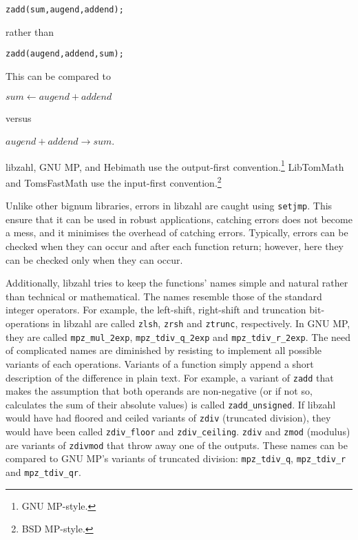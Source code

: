 \begin{alltt}
   zadd(sum, augend, addend);
\end{alltt}

\noindent
rather than

\begin{alltt}
   zadd(augend, addend, sum);
\end{alltt}

\noindent
This can be compared to

\vspace{1em}
$sum \gets augend + addend$
\vspace{1em}

\noindent
versus

\vspace{1em}
$augend + addend \rightarrow sum$.
\vspace{1em}

libzahl, GNU MP, and Hebimath use the output-first
convention.\footnote{GNU MP-style.} LibTomMath and
TomsFastMath use the input-first convention.\footnote{BSD
MP-style.}

Unlike other bignum libraries, errors in libzahl are
caught using {\tt setjmp}. This ensure that it can be
used in robust applications, catching errors does not
become a mess, and it minimises the overhead of
catching errors. Typically, errors can be checked when
they can occur and after each function return; however,
here they can be checked only when they can occur.

Additionally, libzahl tries to keep the functions'
names simple and natural rather than technical or
mathematical. The names resemble those of the standard
integer operators. For example, the left-shift, right-shift
and truncation bit-operations in libzahl are called
{\tt zlsh}, {\tt zrsh} and {\tt ztrunc}, respectively.
In GNU MP, they are called {\tt mpz\_mul\_2exp},
{\tt mpz\_tdiv\_q\_2exp} and {\tt mpz\_tdiv\_r\_2exp}.
The need of complicated names are diminished by resisting
to implement all possible variants of each operations.
Variants of a function simply append a short description
of the difference in plain text. For example, a variant of
{\tt zadd} that makes the assumption that both operands
are non-negative (or if not so, calculates the sum of
their absolute values) is called {\tt zadd\_unsigned}.
If libzahl would have had floored and ceiled variants of
{\tt zdiv} (truncated division), they would have been
called {\tt zdiv\_floor} and {\tt zdiv\_ceiling}.
{\tt zdiv} and {\tt zmod} (modulus) are variants of
{\tt zdivmod} that throw away one of the outputs. These
names can be compared to GNU MP's variants of truncated
division: {\tt mpz\_tdiv\_q}, {\tt mpz\_tdiv\_r} and
{\tt mpz\_tdiv\_qr}.


